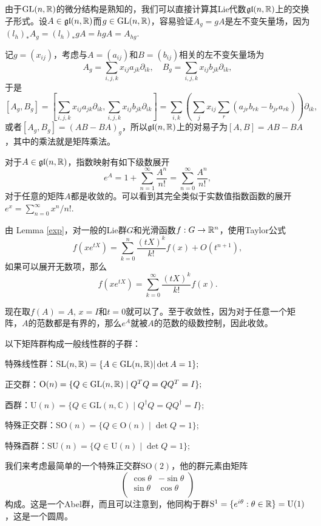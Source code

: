 \documentclass[11pt]{article}
\theoremstyle{definition}
\theoremstyle{plain}
\newcommand{\cc}{\mathbb{C}}
\begin{document}

由于$\mathrm{GL}(n,\mathbb{R})$的微分结构是熟知的，我们可以直接计算其Lie代数$\mathfrak{gl}(n,\mathbb{R})$上的交换子形式。设$A\in\mathfrak{gl}(n,\mathbb{R})$而$g\in\mathrm{GL}(n,\mathbb{R})$，容易验证$A_g=gA$是左不变矢量场，因为$(l_h)_{*}A_g=(l_h)_{*}gA=hgA=A_{hg}$.

记$g=(x_{ij})$，考虑与$A=(a_{ij})$和$B=(b_{ij})$相关的左不变矢量场为
\[
A_g=\sum_{i,j,k}x_{ij}a_{jk}\partial_{ik},\quad B_g=\sum_{i,j,k}x_{ij}b_{jk}\partial_{ik},
\]
于是
\[
[A_g,B_g]=\left[\sum_{i,j,k}x_{ij}a_{jk}\partial_{ik},\sum_{i,j,k}x_{ij}b_{jk}\partial_{ik}\right]=\sum_{i,k}\left(\sum_{j}x_{ij}\sum_{r}(a_{jr}b_{rk}-b_{jr}a_{rk})\right)\partial_{ik},
\]
或者$[A_g,B_g]=(AB-BA)_g$，所以$\mathfrak{gl}(n,\mathbb{R})$上的对易子为$[A,B]=AB-BA$，其中的乘法就是矩阵乘法。

\para 对于$A\in\mathfrak{gl}(n,\mathbb{R})$，指数映射有如下级数展开
\[
	e^A=1+\sum_{n=1}^\infty \frac{A^n}{n!}=\sum_{n=0}^\infty \frac{A^n}{n!},
\]
对于任意的矩阵$A$都是收敛的。可以看到其完全类似于实数值指数函数的展开$e^x=\sum_{n=0}^\infty x^n/n!$.

\proof 由 Lemma \ref{exp}，对一般的Lie群$G$和光滑函数$f:G\to \mathbb{R}^n$，使用Taylor公式
\[
	f(xe^{tX})=\sum_{k=0}^n\frac{(tX)^{k}}{k!}f(x)+O(t^{n+1}),
\]
如果可以展开无数项，那么
\[
	f(xe^{tX})=\sum_{k=0}^\infty\frac{(tX)^{k}}{k!}f(x).
\]

现在取$f(A)=A$, $x=I$和$t=0$就可以了。至于收敛性，因为对于任意一个矩阵，$A$的范数都是有界的，那么$e^A$就被$A$的范数的级数控制，因此收敛。\endproof

\para 以下矩阵群构成一般线性群的子群：

 特殊线性群：$\mathrm{SL}(n,\mathbb{R})=\{A\in \mathrm{GL}(n,\mathbb{R})|\det A=1\};$

 正交群：$\mathrm{O}(n) = \{ Q \in \mathrm{GL}(n,\mathbb{R}) \mid Q^T Q = Q Q^T = I \};$

 酉群：$\mathrm{U}(n) = \{ Q \in \mathrm{GL}(n,\cc) \mid Q^\dag Q = Q Q^\dag = I \};$

 特殊正交群：$\mathrm{SO}(n) =\{ Q \in \mathrm{O}(n) \mid \det Q=1 \};$

 特殊酉群：$\mathrm{SU}(n) =\{ Q \in \mathrm{U}(n) \mid \det Q=1 \};$

我们来考虑最简单的一个特殊正交群$\mathrm{SO}(2)$，他的群元素由矩阵
\[
	\begin{pmatrix}
	\cos \theta&-\sin \theta\\
	\sin \theta&\cos \theta\\
	\end{pmatrix}
\]
构成。这是一个Abel群，而且可以注意到，他同构于群$\mathrm{S}^1=\{e^{i\theta}:\theta\in\mathbb{R}\}=\mathrm{U}(1)$，这是一个圆周。
\end{document}
